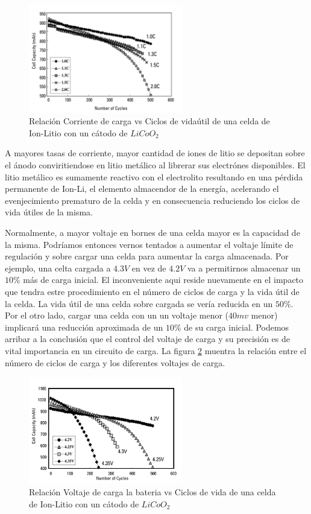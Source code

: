 \documentclass[10pt,a4paper]{article}
\begin{document}
\begin{figure}[h!] \centering
    \includegraphics[width=0.6\textwidth]{bat_char/C_vs_Cycle_I.png}
    \caption{Relación Corriente de carga vs Ciclos de vidaútil de una celda de
    Ion-Litio con un cátodo de $LiCoO_2$} \label{fig:C_vs_Cycle_I} 
\end{figure}
\FloatBarrier

A mayores tasas de corriente, mayor cantidad de iones de litio se depositan
sobre el ánodo conviritiendose en litio metálico al librerar sus electrónes
disponibles.  El litio metálico es sumamente reactivo con el electrolito
resultando en una pérdida permanente de \acrshort{Ion-Li}, el elemento
almacendor de la energía, acelerando el evenjecimiento prematuro de la celda y
en consecuencia reduciendo los ciclos de vida útiles de la misma. 

Normalmente, a mayor voltaje en bornes de una celda mayor es la capacidad de la
misma. Podríamos entonces vernos tentados a aumentar el voltaje límite de
regulación y sobre cargar una celda para aumentar la carga almacenada. Por
ejemplo, una celta cargada a $4.3V$ en vez de $4.2V$ va a permitirnos almacenar
un $10\%$ más de carga inicial. El inconveniente aqui reside nuevamente en el
impacto que tendra estre procedimiento en el número de ciclos de carga y la vida
útil de la celda. La vida útil de una celda sobre cargada se vería reducida en
un $50\%$.  Por el otro lado, cargar una celda con un un voltaje menor ($40mv$
menor) implicará una reducción aproximada de un $10\%$ de su carga inicial.
Podemos arribar a la conclusión que el control del voltaje de carga y su
precisión es de vital importancia en un circuito de carga. La figura
\ref{fig:C_vs_Cycle_V} muentra la relación entre el número de ciclos de carga y
los diferentes voltajes de carga. 

\begin{figure}[h!] \centering
    \includegraphics[width=0.6\textwidth]{bat_char/C_vs_Cycle_V.png}
    \caption{Relación Voltaje de carga la bateria vs Ciclos de vida de una celda de
Ion-Litio con un cátodo de $LiCoO_2$} \label{fig:C_vs_Cycle_V} \end{figure}
\FloatBarrier
\end{document}
